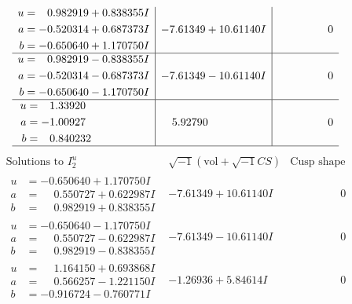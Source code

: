 \documentclass[1p]{elsarticle_modified}
\theoremstyle{definition}
\newcommand{\I}{\sqrt{-1}}
\begin{document}
$$\begin{array}{c|c|c}
\begin{aligned}
u &= \phantom{-}0.982919 + 0.838355 I \\
a &= -0.520314 + 0.687373 I \\
b &= -0.650640 + 1.170750 I\end{aligned}
 & -7.61349 + 10.61140 I & \phantom{-0.000000 } 0 \\ \hline\begin{aligned}
u &= \phantom{-}0.982919 - 0.838355 I \\
a &= -0.520314 - 0.687373 I \\
b &= -0.650640 - 1.170750 I\end{aligned}
 & -7.61349 - 10.61140 I & \phantom{-0.000000 } 0 \\ \hline\begin{aligned}
u &= \phantom{-}1.33920\phantom{ +0.000000I} \\
a &= -1.00927\phantom{ +0.000000I} \\
b &= \phantom{-}0.840232\phantom{ +0.000000I}\end{aligned}
 & \phantom{-}5.92790\phantom{ +0.000000I} & \phantom{-0.000000 } 0\\
 \hline 
 \end{array}$$\newpage$$\begin{array}{c|c|c}  
\text{Solutions to }I^u_{2}& \I (\text{vol} + \sqrt{-1}CS) & \text{Cusp shape}\\
 \hline 
\begin{aligned}
u &= -0.650640 + 1.170750 I \\
a &= \phantom{-}0.550727 + 0.622987 I \\
b &= \phantom{-}0.982919 + 0.838355 I\end{aligned}
 & -7.61349 + 10.61140 I & \phantom{-0.000000 } 0 \\ \hline\begin{aligned}
u &= -0.650640 - 1.170750 I \\
a &= \phantom{-}0.550727 - 0.622987 I \\
b &= \phantom{-}0.982919 - 0.838355 I\end{aligned}
 & -7.61349 - 10.61140 I & \phantom{-0.000000 } 0 \\ \hline\begin{aligned}
u &= \phantom{-}1.164150 + 0.693868 I \\
a &= \phantom{-}0.566257 - 1.221150 I \\
b &= -0.916724 - 0.760771 I\end{aligned}
 & -1.26936 + 5.84614 I & \phantom{-0.000000 } 0 \\ \hline\begin{aligned}

\end{aligned}
\end{array}$$
\end{document}
